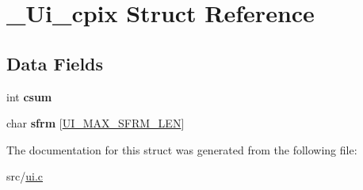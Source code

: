 \hypertarget{struct__Ui__cpix}{}\section{\+\_\+\+Ui\+\_\+cpix Struct Reference}
\label{struct__Ui__cpix}
\subsection*{Data Fields}
\begin{DoxyCompactItemize}
\item 
\mbox{\label{struct__Ui__cpix_ab07eb60dfd57cf3b0323dcdec7945832}} 
int {\bfseries csum}
\item 
\mbox{\label{struct__Ui__cpix_a6d44491b5ed84ac881de85d43625c4cf}} 
char {\bfseries sfrm} \mbox{[}\hyperlink{ui_8c_aa491d6f223cbad9e34fff4c5e09efd1d}{U\+I\+\_\+\+M\+A\+X\+\_\+\+S\+F\+R\+M\+\_\+\+L\+EN}\mbox{]}
\end{DoxyCompactItemize}


The documentation for this struct was generated from the following file\+:\begin{DoxyCompactItemize}
\item 
src/\hyperlink{ui_8c}{ui.\+c}\end{DoxyCompactItemize}
